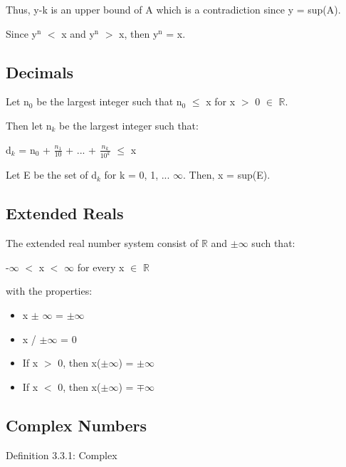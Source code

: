 \qquad Thus, y-k is an upper bound of A which is a contradiction since y = sup(A).

Since y$^\text{n}$ $<$ x and y$^\text{n}$ $>$ x, then y$^\text{n}$ = x. 

\newpage





\subsection{Decimals}

Let n$_0$ be the largest integer such that n$_0$ $\leq$ x for x $>$ 0 $\in$ $\mathbb{R}$.

Then let n$_k$ be the largest integer such that:

\qquad d$_k$ = n$_0$ + $\frac{n_1}{10}$ + ... + $\frac{n_k}{10^k}$ $\leq$ x

Let E be the set of d$_k$ for k = 0, 1, ... $\infty$. Then, x = sup(E).





\subsection{Extended Reals}

The extended real number system consist of $\mathbb{R}$ and $\pm$$\infty$ such that:

\qquad -$\infty$ $<$ x $<$ $\infty$	\qquad for every x $\in$ $\mathbb{R}$

with the properties:
\begin{itemize}[leftmargin=2cm]
	\item x $\pm$ $\infty$ = $\pm$$\infty$
	
	\item x / $\pm$$\infty$ = 0

	\item If x $>$ 0, then x($\pm$$\infty$) = $\pm$$\infty$

	\item If x $<$ 0, then x($\pm$$\infty$) = $\mp$$\infty$
\end{itemize}





\subsection{Complex Numbers}

	{ \color{blue} Definition 3.3.1: Complex } 
	
